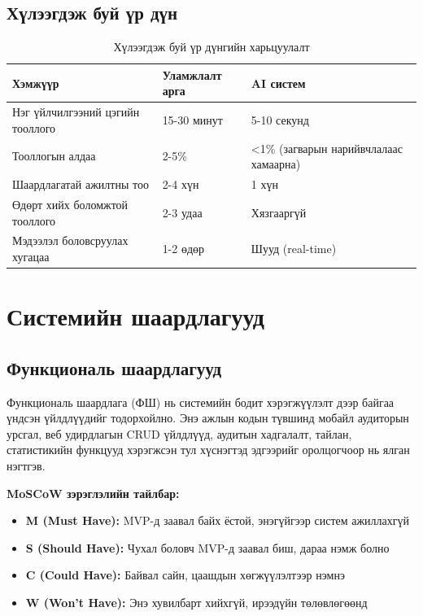 \subsection{Хүлээгдэж буй үр дүн}

\begin{longtable}{|p{4cm}|p{4cm}|p{4.5cm}|}
\caption{Хүлээгдэж буй үр дүнгийн харьцуулалт}
\label{tab:expected_results} \\
\hline
\textbf{Хэмжүүр} & \textbf{Уламжлалт арга} & \textbf{AI систем} \\
\hline
Нэг үйлчилгээний цэгийн тооллого & 15-30 минут & 5-10 секунд \\
\hline
Тооллогын алдаа & 2-5\% & <1\% (загварын нарийвчлалаас хамаарна) \\
\hline
Шаардлагатай ажилтны тоо & 2-4 хүн & 1 хүн \\
\hline
Өдөрт хийх боломжтой тооллого & 2-3 удаа & Хязгааргүй \\
\hline
Мэдээлэл боловсруулах хугацаа & 1-2 өдөр & Шууд (real-time) \\
\hline
\end{longtable}

\section{Системийн шаардлагууд}

\subsection{Функциональ шаардлагууд}

Функциональ шаардлага (ФШ) нь системийн бодит хэрэгжүүлэлт дээр байгаа үндсэн үйлдлүүдийг тодорхойлно. Энэ ажлын кодын түвшинд мобайл аудиторын урсгал, веб удирдлагын CRUD үйлдлүүд, аудитын хадгалалт, тайлан, статистикийн функцууд хэрэгжсэн тул хүснэгтэд эдгээрийг оролцогчоор нь ялган нэгтгэв.

\textbf{MoSCoW зэрэглэлийн тайлбар:}
\begin{itemize}
    \item \textbf{M (Must Have):} MVP-д заавал байх ёстой, энэгүйгээр систем ажиллахгүй
    \item \textbf{S (Should Have):} Чухал боловч MVP-д заавал биш, дараа нэмж болно
    \item \textbf{C (Could Have):} Байвал сайн, цаашдын хөгжүүлэлтээр нэмнэ
    \item \textbf{W (Won't Have):} Энэ хувилбарт хийхгүй, ирээдүйн төлөвлөгөөнд
\end{itemize}

